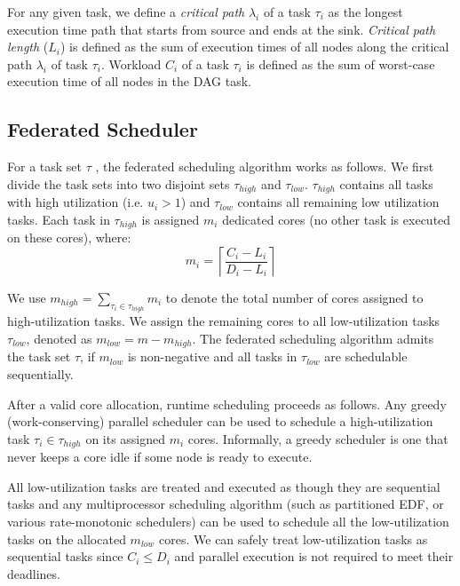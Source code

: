For any given task, we define a \textit{critical path} $\lambda_i$ of a 
task $\tau_i$ as the longest execution time path that starts from
source and ends at the sink. \textit{Critical path length} ($L_i$) is
defined as the sum of execution times of all nodes along the critical
path $\lambda_i$ of task $\tau_i$.  Workload $C_i$ of
a task $\tau_i$ is defined as the sum of worst-case execution time of
all nodes in the DAG task. 


\subsection{Federated Scheduler}
For a task set $\tau$ , the federated scheduling algorithm works as
follows. We first divide the task sets into two disjoint sets
$\tau_{high}$  and $\tau_{low}$. $\tau_{high}$ contains all tasks with
high utilization (i.e. $u_i > 1$) and $\tau_{low}$ contains all
remaining low utilization tasks. Each task in $\tau_{high}$ is
assigned $m_i$ dedicated cores (no other task is executed on these
cores), where: \begin{equation}\label{eq:m} m_i = \left\lceil \frac{C_i - L_i}{D_i - L_i}
\right\rceil \end{equation}

We use $m_{high} = \sum_{\tau_i \in \tau_{high}} m_i$ to denote the total
number of cores assigned to high-utilization tasks. We assign
the remaining cores to all low-utilization tasks $\tau_{low}$, denoted
as ${m_{low} = m - m_{high}}$. The federated scheduling algorithm admits
the task set ${\tau}$, if $m_{low}$ is non-negative and all tasks in
$\tau_{low}$ are schedulable sequentially.  

After a valid core allocation, runtime scheduling proceeds as
follows. Any greedy (work-conserving) parallel scheduler can be used
to schedule a high-utilization task $\tau_i \in \tau_{high}$ on its
assigned $m_i$ cores. Informally, a greedy scheduler is one that never
keeps a core idle if some node is ready to execute. 

All low-utilization tasks are treated and executed as though they are
sequential tasks and any multiprocessor scheduling algorithm (such as
partitioned EDF, or various rate-monotonic schedulers) can be used to
schedule all the low-utilization tasks on the allocated $m_{low}$
cores. We can safely treat low-utilization tasks as sequential tasks
since $C_i \le D_i$ and parallel execution is not required to meet their
deadlines. 


